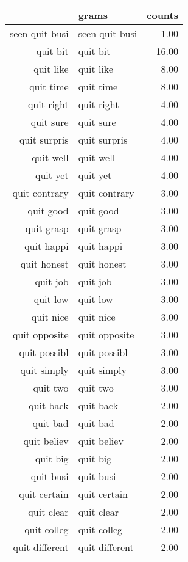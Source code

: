 \begin{table}[ht]
\centering
\begin{tabular}{rlr}
  \hline
 & grams & counts \\ 
  \hline
seen quit busi & seen quit busi & 1.00 \\ 
  quit bit & quit bit & 16.00 \\ 
  quit like & quit like & 8.00 \\ 
  quit time & quit time & 8.00 \\ 
  quit right & quit right & 4.00 \\ 
  quit sure & quit sure & 4.00 \\ 
  quit surpris & quit surpris & 4.00 \\ 
  quit well & quit well & 4.00 \\ 
  quit yet & quit yet & 4.00 \\ 
  quit contrary & quit contrary & 3.00 \\ 
  quit good & quit good & 3.00 \\ 
  quit grasp & quit grasp & 3.00 \\ 
  quit happi & quit happi & 3.00 \\ 
  quit honest & quit honest & 3.00 \\ 
  quit job & quit job & 3.00 \\ 
  quit low & quit low & 3.00 \\ 
  quit nice & quit nice & 3.00 \\ 
  quit opposite & quit opposite & 3.00 \\ 
  quit possibl & quit possibl & 3.00 \\ 
  quit simply & quit simply & 3.00 \\ 
  quit two & quit two & 3.00 \\ 
  quit back & quit back & 2.00 \\ 
  quit bad & quit bad & 2.00 \\ 
  quit believ & quit believ & 2.00 \\ 
  quit big & quit big & 2.00 \\ 
  quit busi & quit busi & 2.00 \\ 
  quit certain & quit certain & 2.00 \\ 
  quit clear & quit clear & 2.00 \\ 
  quit colleg & quit colleg & 2.00 \\ 
  quit different & quit different & 2.00 \\ 

\end{tabular}
\end{table}
